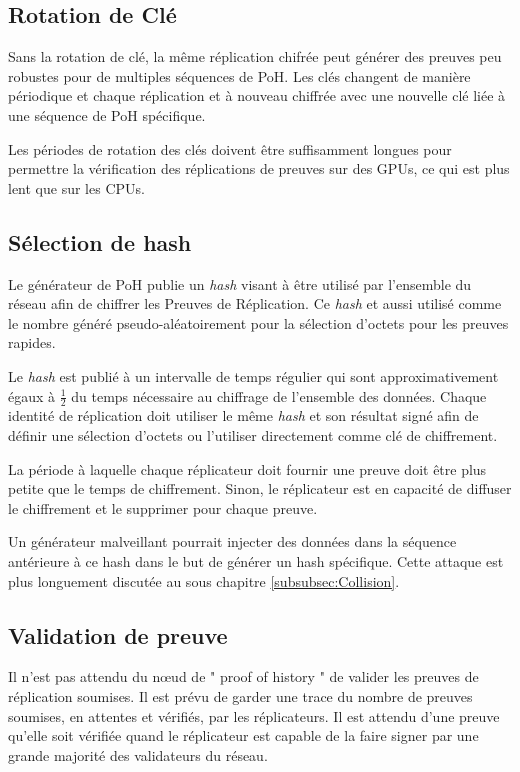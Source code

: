 \documentclass[12pt]{article}
\begin{document}
\subsection{Rotation de Clé}

Sans la rotation de clé, la même réplication chifrée peut générer des  preuves peu robustes pour de multiples séquences de PoH. Les clés changent de manière périodique et chaque réplication et à nouveau chiffrée avec une nouvelle clé liée à une séquence de PoH spécifique.

Les périodes de rotation des clés doivent être suffisamment longues pour permettre la vérification des réplications de preuves sur des GPUs, ce qui est plus lent que sur les CPUs.

\subsection{Sélection de hash}\label{selectiondehash}

Le générateur de PoH publie un \textit{hash} visant à être utilisé par l’ensemble du réseau afin de chiffrer les Preuves de Réplication. Ce \textit{hash} et aussi utilisé comme le nombre généré pseudo-aléatoirement pour la sélection d'octets pour les preuves rapides.

Le \textit{hash} est publié à un intervalle de temps régulier qui sont approximativement égaux à \(\frac{1}{2}\) du temps nécessaire au chiffrage de l’ensemble des données. Chaque identité de réplication doit utiliser le même \textit{hash} et son résultat signé afin de définir une sélection d'octets ou l'utiliser directement comme clé de chiffrement.

La période à laquelle chaque réplicateur doit fournir une preuve doit être plus petite que le temps de chiffrement. Sinon, le réplicateur est en capacité de diffuser le chiffrement et le supprimer pour chaque preuve.

Un générateur malveillant pourrait injecter des données dans la séquence antérieure à ce hash dans le but de générer un hash spécifique. Cette attaque est plus longuement discutée au sous chapitre \ref{subsubsec:Collision}.

\subsection{Validation de preuve}
Il n'est pas attendu du nœud de " proof of history " de valider les preuves de réplication soumises. Il est prévu de garder une trace du nombre de preuves soumises, en attentes et vérifiés, par les réplicateurs. Il est attendu d’une preuve qu’elle soit vérifiée quand le réplicateur est capable de la faire signer par une grande majorité des validateurs du réseau.
\end{document}
